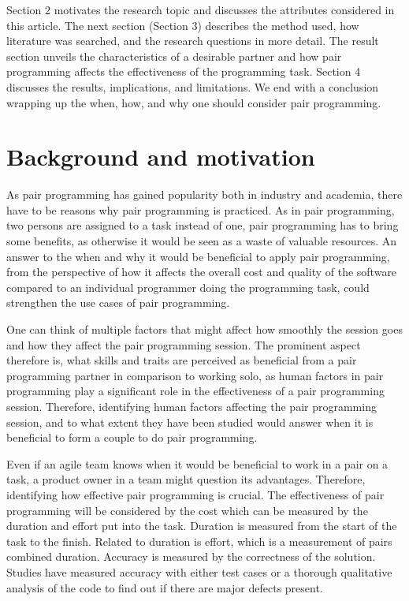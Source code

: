\documentclass[conference]{IEEEtran}
\begin{document}
Section 2 motivates the research topic and discusses the attributes considered in this article. The next section (Section 3) describes the method used, how literature was searched, and the research questions in more detail. The result section unveils the characteristics of a desirable partner and how pair programming affects the effectiveness of the programming task. Section 4 discusses the results, implications, and limitations. We end with a conclusion wrapping up the when, how, and why one should consider pair programming.

\section{Background and motivation}

As pair programming has gained popularity both in industry and academia, there have to be reasons why pair programming is practiced. As in pair programming, two persons are assigned to a task instead of one, pair programming has to bring some benefits, as otherwise it would be seen as a waste of valuable resources. An answer to the when and why it would be beneficial to apply pair programming, from the perspective of how it affects the overall cost and quality of the software compared to an individual programmer doing the programming task, could strengthen the use cases of pair programming.

One can think of multiple factors that might affect how smoothly the session goes and how they affect the pair programming session. The prominent aspect therefore is, what skills and traits are perceived as beneficial from a pair programming partner in comparison to working solo, as human factors in pair programming play a significant role in the effectiveness of a pair programming session. Therefore, identifying human factors affecting the pair programming session, and to what extent they have been studied would answer when it is beneficial to form a couple to do pair programming.

Even if an agile team knows when it would be beneficial to work in a pair on a task, a product owner in a team might question its advantages. Therefore, identifying how effective pair programming is crucial. The effectiveness of pair programming will be considered by the cost which can be measured by the duration and effort put into the task. Duration is measured from the start of the task to the finish. Related to duration is effort, which is a measurement of pairs combined duration. Accuracy is measured by the correctness of the solution. Studies have measured accuracy with either test cases or a thorough qualitative analysis of the code to find out if there are major defects present.
\end{document}
